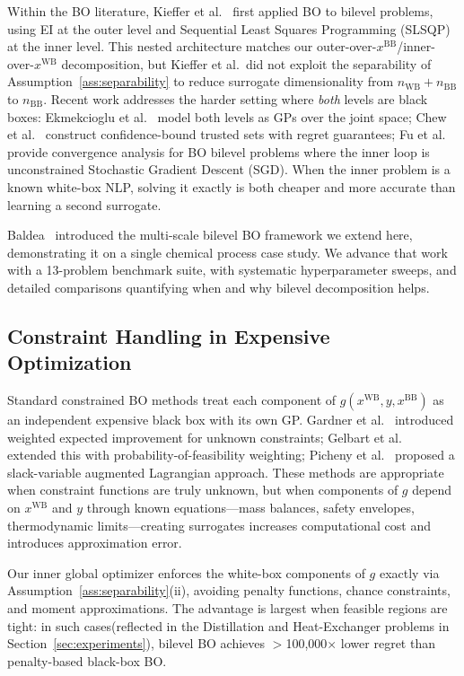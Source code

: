 \documentclass[12pt,a4paper]{article}%
\theoremstyle{plain}%
\theoremstyle{remark}%
\theoremstyle{definition}%
\def\WB{\mathrm{WB}}
\def\BB{\mathrm{BB}}
\begin{document}
Within the BO literature, Kieffer et al.~\cite{kieffer2017bilevel} first applied BO to bilevel problems, using EI at the outer level and Sequential Least Squares Programming (SLSQP) at the inner level. This nested architecture matches our outer-over-$x^{\BB}$/inner-over-$x^{\WB}$ decomposition, but Kieffer et al.\ did not exploit the separability of Assumption~\ref{ass:separability} to reduce surrogate dimensionality from $n_{\WB}+n_{\BB}$ to $n_{\BB}$. Recent work addresses the harder setting where \emph{both} levels are black boxes: Ekmekcioglu et al.~\cite{ekmekcioglu2024bilevel} model both levels as GPs over the joint space; Chew et al.~\cite{chew2025bilbo} construct confidence-bound trusted sets with regret guarantees; Fu et al.~\cite{fu2024convergence} provide convergence analysis for BO bilevel problems where the inner loop is unconstrained Stochastic Gradient Descent (SGD). When the inner problem is a known white-box NLP, solving it exactly is both cheaper and more accurate than learning a second surrogate.

Baldea~\cite{baldea2026multiscale} introduced the multi-scale bilevel BO framework we extend here, demonstrating it on a single chemical process case study. We advance that work with a 13-problem benchmark suite, with systematic hyperparameter sweeps, and detailed comparisons quantifying when and why bilevel decomposition helps.

\subsection{Constraint Handling in Expensive Optimization}

Standard constrained BO methods treat each component of $g(x^{\WB}, y, x^{\BB})$ as an independent expensive black box with its own GP. Gardner et al.~\cite{gardner2014} introduced weighted expected improvement for unknown constraints; Gelbart et al.~\cite{gelbart2014unknown} extended this with probability-of-feasibility weighting; Picheny et al.~\cite{picheny2016albo} proposed a slack-variable augmented Lagrangian approach. These methods are appropriate when constraint functions are truly unknown, but when components of $g$ depend on $x^{\WB}$ and $y$ through known equations---mass balances, safety envelopes, thermodynamic limits---creating surrogates increases computational cost and introduces approximation error.

Our inner global optimizer enforces the white-box components of $g$ exactly via Assumption~\ref{ass:separability}(ii), avoiding penalty functions, chance constraints, and moment approximations. The advantage is largest when feasible regions are tight: in such cases(reflected in the Distillation and Heat-Exchanger problems in Section~\ref{sec:experiments}), bilevel BO achieves $>$100{,}000$\times$ lower regret than penalty-based black-box BO.
\end{document}
